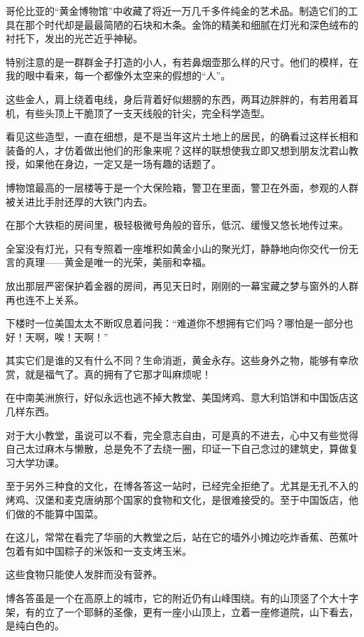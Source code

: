 \par 哥伦比亚的“黄金博物馆”中收藏了将近一万几千多件纯金的艺术品。制造它们的工具在那个时代却是最最简陋的石块和木条。金饰的精美和细腻在灯光和深色绒布的衬托下，发出的光芒近乎神秘。
\par 特别注意的是一群群金子打造的小人，有若鼻烟壶那么样的尺寸。他们的模样，在我的眼中看来，每一个都像外太空来的假想的“人”。
\par 这些金人，肩上绕着电线，身后背着好似翅膀的东西，两耳边胖胖的，有若用着耳机，有些头顶上干脆顶了一支天线般的针尖，完全科学造型。
\par 看见这些造型，一直在细想，是不是当年这片土地上的居民，的确看过这样长相和装备的人，才仿着做出他们的形象来呢？这样的联想使我立即又想到朋友沈君山教授，如果他在身边，一定又是一场有趣的话题了。
\par 博物馆最高的一层楼等于是一个大保险箱，警卫在里面，警卫在外面，参观的人群被关进比手肘还厚的大铁门内去。
\par 在那个大铁柜的房间里，极轻极微号角般的音乐，低沉、缓慢又悠长地传过来。
\par 全室没有灯光，只有专照着一座堆积如黄金小山的聚光灯，静静地向你交代一份无言的真理——黄金是唯一的光荣，美丽和幸福。
\par 放出那层严密保护着金器的房间，再见天日时，刚刚的一幕宝藏之梦与窗外的人群再也连不上关系。
\par 下楼时一位美国太太不断叹息着问我：“难道你不想拥有它们吗？哪怕是一部分也好！天啊，唉！天啊！”
\par 其实它们是谁的又有什么不同？生命消逝，黄金永存。这些身外之物，能够有幸欣赏，就是福气了。真的拥有了它那才叫麻烦呢！
\par 在中南美洲旅行，好似永远也逃不掉大教堂、美国烤鸡、意大利馅饼和中国饭店这几样东西。
\par 对于大小教堂，虽说可以不看，完全意志自由，可是真的不进去，心中又有些觉得自己太过麻木与懒散，总是免不了去绕一圈，印证一下自己念过的建筑史，算做复习大学功课。
\par 至于另外三种食的文化，在博各答这一站时，已经完全拒绝了。尤其是无孔不入的烤鸡、汉堡和麦克唐纳那个国家的食物和文化，是很难接受的。至于中国饭店，他们做的不能算中国菜。
\par 在这儿，常常在看完了华丽的大教堂之后，站在它的墙外小摊边吃炸香蕉、芭蕉叶包着有如中国粽子的米饭和一支支烤玉米。
\par 这些食物只能使人发胖而没有营养。
\par 博各答虽是一个在高原上的城市，它的附近仍有山峰围绕。有的山顶竖了个大十字架，有的立了一个耶稣的圣像，更有一座小山顶上，立着一座修道院，山下看去，是纯白色的。
